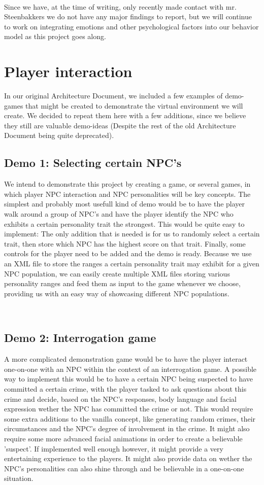 \documentclass[11pt]{article} %
\begin{document}
~\\
Since we have, at the time of writing, only recently made contact with mr. Steenbakkers we do not have any major findings to report, but we will continue to work on integrating emotions and other psychological factors into our behavior model as this project goes along.

\newpage
\section{Player interaction}
In our original Architecture Document, we included a few examples of demo-games that might be created to demonstrate the virtual environment we will create. We decided to repeat them here with a few additions, since we believe they still are valuable demo-ideas (Despite the rest of the old Architecture Document being quite deprecated).


\subsection{Demo 1: Selecting certain NPC's}
We intend to demonstrate this project by creating a game, or several games, in which player NPC interaction and NPC personalities will be key concepts. The simplest and probably most usefull kind of demo would be to have the player walk around a group of NPC's and have the player identify the NPC who exhibits a certain personality trait the strongest. This would be quite easy to implement: The only addition that is needed is for us to randomly select a certain trait, then store which NPC has the highest score on that trait. Finally, some controls for the player need to be added and the demo is ready. Because we use an XML file to store the ranges a certain personality trait may exhibit for a given NPC population, we can easily create multiple XML files storing various personality ranges and feed them as input to the game whenever we choose, providing us with an easy way of showcasing different NPC populations.

~\\
\subsection{Demo 2: Interrogation game}
A more complicated demonstration game would be to have the player interact one-on-one with an NPC within the context of an interrogation game. A possible way to implement this would be to have a certain NPC being suspected to have committed a certain crime, with the player tasked to ask questions about this crime and decide, based on the NPC's responses, body language and facial expression wether the NPC has committed the crime or not. This would require some extra additions to the vanilla concept, like generating random crimes, their circumstances and the NPC's degree of involvement in the crime. It might also require some more advanced facial animations in order to create a believable 'suspect'. If implemented well enough however, it might provide a very entertaining experience to the players. It might also provide data on wether the NPC's personalities can also shine through and be believable in a one-on-one situation.
\end{document}
